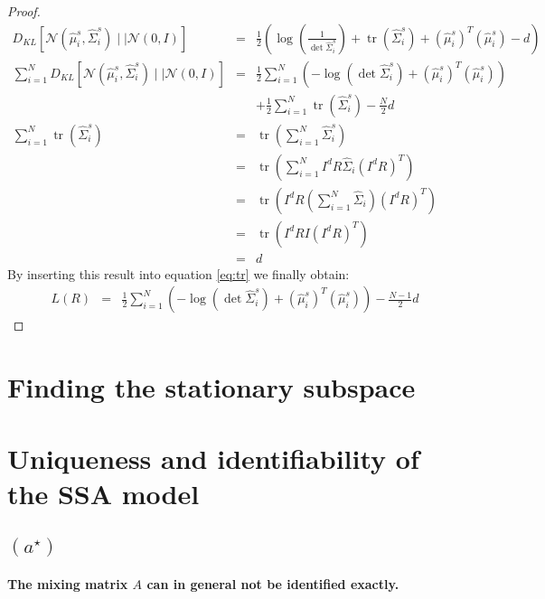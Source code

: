 \documentclass[a4paper, 12pt, titlepage]{article}
\DeclareMathOperator{\tr}{tr}
\begin{document}
\begin{proof}
	\begin{eqnarray}
		D_{KL}\left[\mathcal{N}(\hat{ \mu}_i^{s}, \hat{ \Sigma}_i^s )\mid \mid \mathcal{N}(0, I) \right] &=& \frac{1}{2} \left(\log\left( \frac{1}{\det \hat{ \Sigma}_i^s} \right) + \tr(\hat\Sigma_i^s) + (\hat\mu_i^s)^T(\hat\mu_i^s) - d \right)\\
		 \sum_{i=1}^N D_{KL}\left[\mathcal{N}(\hat{ \mu}_i^{s}, \hat{ \Sigma}_i^s )\mid \mid \mathcal{N}(0, I) \right] &=& \frac{1}{2}\sum_{i=1}^{N} \left( -\log \left( \det \hat \Sigma_i^s \right) + (\hat\mu_i^s)^T(\hat\mu_i^s) \right) \nonumber\\
		 &&+\frac{1}{2}\sum_{i=1}^N \tr(\hat \Sigma_i^s) - \frac{N}{2}d \label{eq:tr}\\
		 \sum_{i=1}^N \tr(\hat \Sigma_i^s) &=& \tr\left(\sum_{i=1}^N \hat\Sigma_i^s \right)\\
		 &=& \tr\left(\sum_{i=1}^N I^dR\hat\Sigma_i (I^dR)^T \right) \\
		 &=& \tr \left( I^dR \left( \sum_{i=1}^N \hat \Sigma_i \right) (I^dR)^T \right)\\
		 &=& \tr \left( I^dR I (I^dR)^T \right)\\
		 &=& d
	\end{eqnarray}
	By inserting this result into equation \eqref{eq:tr} we finally obtain:
	\begin{eqnarray}
		 L(R) &=& \frac{1}{2}\sum_{i=1}^{N} \left( -\log \left( \det \hat \Sigma_i^s \right) + (\hat\mu_i^s)^T(\hat\mu_i^s) \right) - \frac{N-1}{2}d
	\end{eqnarray}
\end{proof}



\section{Finding the stationary subspace}

\section{Uniqueness and identifiability of the SSA model}

\subsection*{$\left(a^\star\right)$}

\paragraph{The mixing matrix $A$ can in general not be identified exactly.}
\end{document}
